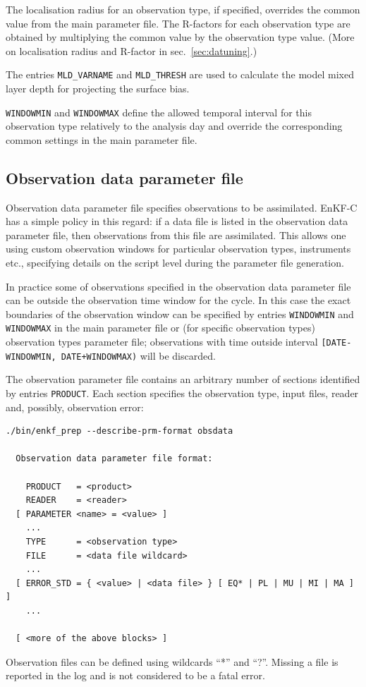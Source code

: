 \documentclass[11pt]{report}
\begin{document}
The localisation radius for an observation type, if specified, overrides the
common value from the main parameter file.
The R-factors for each observation type are obtained by multiplying the common
value by the observation type value.
(More on localisation radius and R-factor in sec.~\ref{sec:datuning}.)

The entries \verb|MLD_VARNAME| and \verb|MLD_THRESH| are used to calculate the model mixed layer depth for projecting the surface bias.

\verb|WINDOWMIN| and \verb|WINDOWMAX| define the allowed temporal interval for this observation type relatively to the analysis day and override the corresponding common settings in the main parameter file.

\subsection{Observation data parameter file}

Observation data parameter file specifies observations to be assimilated.
EnKF-C has a simple policy in this regard: if a data file is listed in the observation data parameter file, then observations from this file are assimilated.
This allows one using custom observation windows for particular observation types, instruments etc., specifying details on the script level during the parameter file generation.

In practice some of observations specified in the observation data parameter file can be outside the observation time window for the cycle.
In this case the exact boundaries of the observation window can be specified by entries \verb|WINDOWMIN| and \verb|WINDOWMAX| in the main parameter file or (for specific observation types) observation types parameter file;
observations with time outside interval \verb|[DATE-WINDOWMIN, DATE+WINDOWMAX)| will be discarded.

The observation parameter file contains an arbitrary number of sections identified by entries \verb|PRODUCT|.
Each section specifies the observation type, input files, reader and, possibly, observation error:
\begin{Verbatim}[frame=single,fontsize=\footnotesize]
./bin/enkf_prep --describe-prm-format obsdata

  Observation data parameter file format:

    PRODUCT   = <product>
    READER    = <reader>
  [ PARAMETER <name> = <value> ]
    ...
    TYPE      = <observation type>
    FILE      = <data file wildcard> 
    ...
  [ ERROR_STD = { <value> | <data file> } [ EQ* | PL | MU | MI | MA ] ]
    ...

  [ <more of the above blocks> ]
\end{Verbatim}
Observation files can be defined using wildcards ``*'' and ``?''.
Missing a file is reported in the log and is not considered to be a fatal error.
\end{document}

